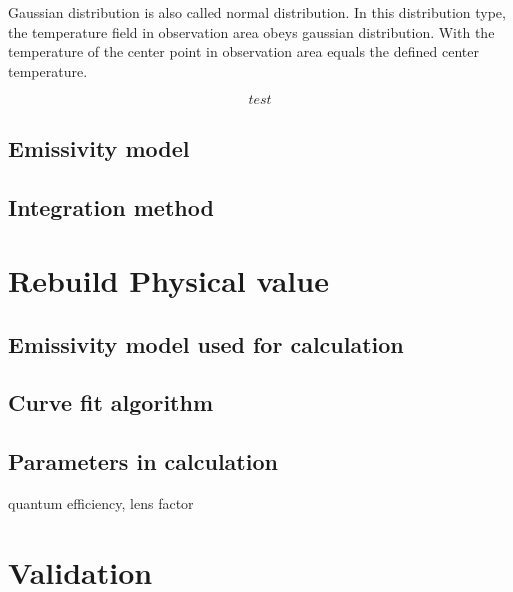 Gaussian distribution is also called normal distribution. In this distribution 
type, the temperature field in observation area obeys gaussian distribution. With 
the temperature of the center point in observation area equals the defined 
center temperature.

\begin{equation}
    test
    \label{eq: gaussian_distribution}
\end{equation}


\subsection{Emissivity model}%
\subsection{Integration method}
\section{Rebuild Physical value}
\subsection{Emissivity model used for calculation}

\subsection{Curve fit algorithm}

\subsection{Parameters in calculation}
quantum efficiency, lens factor

\section{Validation}